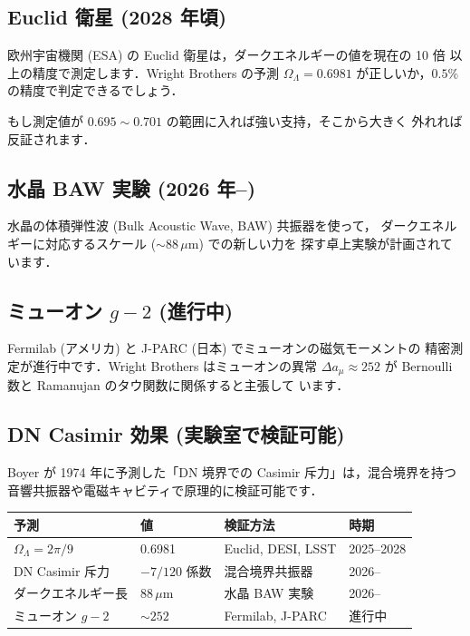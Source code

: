 \documentclass[11pt,a4paper]{article}
\begin{document}
\subsection{Euclid 衛星 (2028 年頃)}

欧州宇宙機関 (ESA) の Euclid 衛星は，ダークエネルギーの値を現在の 10 倍
以上の精度で測定します．Wright Brothers の予測 $\Omega_\Lambda = 0.6981$
が正しいか，$0.5\%$ の精度で判定できるでしょう．

もし測定値が $0.695 \sim 0.701$ の範囲に入れば強い支持，そこから大きく
外れれば反証されます．

\subsection{水晶 BAW 実験 (2026 年--)}

水晶の体積弾性波 (Bulk Acoustic Wave, BAW) 共振器を使って，
ダークエネルギーに対応するスケール ($\sim 88\,\mu$m) での新しい力を
探す卓上実験が計画されています．

\subsection{ミューオン $g-2$ (進行中)}

Fermilab (アメリカ) と J-PARC (日本) でミューオンの磁気モーメントの
精密測定が進行中です．Wright Brothers はミューオンの異常 $\Delta a_\mu
\approx 252$ が Bernoulli 数と Ramanujan のタウ関数に関係すると主張して
います．

\subsection{DN Casimir 効果 (実験室で検証可能)}

Boyer が 1974 年に予測した「DN 境界での Casimir 斥力」は，混合境界を持つ
音響共振器や電磁キャビティで原理的に検証可能です．

\begin{center}
\begin{tabular}{llll}
\toprule
予測 & 値 & 検証方法 & 時期 \\
\midrule
$\Omega_\Lambda = 2\pi/9$ & 0.6981 & Euclid, DESI, LSST & 2025--2028 \\
DN Casimir 斥力 & $-7/120$ 係数 & 混合境界共振器 & 2026-- \\
ダークエネルギー長 & $88\,\mu$m & 水晶 BAW 実験 & 2026-- \\
ミューオン $g-2$ & $\sim 252$ & Fermilab, J-PARC & 進行中 \\
\bottomrule
\end{tabular}
\end{center}
\end{document}
